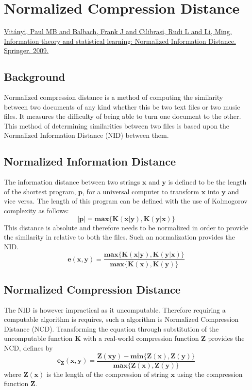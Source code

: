 \section{Normalized Compression Distance}
\href{http://arxiv.org/ftp/arxiv/papers/0809/0809.2553.pdf}{Vit\'{a}nyi, Paul MB and Balbach, Frank J and Cilibrasi, Rudi L and Li, Ming. Information theory and statistical learning: Normalized Information Distance. Springer. 2009.}
\subsection{Background}
Normalized compression distance is a method of computing the similarity between two documents of any kind whether this be two text files or two music files. It measures the difficulty of being able to turn one document to the other. This method of determining similarities between two files is based upon the Normalized Information Distance (NID) between them.

\subsection{Normalized Information Distance}
The information distance between two strings $\boldsymbol{x}$ and $\boldsymbol{y}$ is defined to be the length of the shortest program, $\boldsymbol{p}$, for a universal computer to transform $\boldsymbol{x}$ into $\boldsymbol{y}$ and vice versa. The length of this program can be defined with the use of Kolmogorov complexity as follows:\\
\begin{equation}
\boldsymbol{|p| = \mathbf{max}\{K(x|y),K(y|x)\}}
\end{equation}
This distance is absolute and therefore needs to be normalized in order to provide the similarity in relative to both the files. Such an normalization provides the NID. \\
\begin{equation}
\boldsymbol{e(x,y) = \frac{\mathbf{max}\{K(x|y),K(y|x)\}}{\mathbf{max}\{K(x),K(y)\}}}
\end{equation}

\subsection{Normalized Compression Distance}
The NID is however impractical as it uncomputable. Therefore requiring a computable algorithm is requires, such a algorithm is Normalized Compression Distance (NCD). Transforming the equation through substitution of the uncomputable function $\boldsymbol{K}$ with a real-world compression function $\boldsymbol{Z}$ provides the NCD, defines by
\begin{equation}
\boldsymbol{e_{Z}(x,y) = \frac{Z(xy)-\mathbf{min}\{Z(x),Z(y)\}}{\mathbf{max}\{Z(x),Z(y)\}}}
\end{equation}
where $\boldsymbol{Z(x)}$ is the length of the compression of string $\boldsymbol{x}$ using the compression function $\boldsymbol{Z}$.

